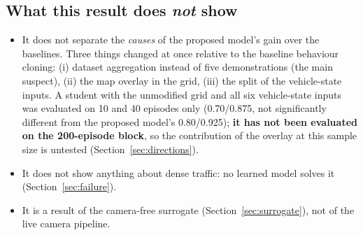 



\subsection{What this result does \emph{not} show}
\begin{itemize}
\item It does not separate the \emph{causes} of the proposed model's gain over the baselines. Three things changed at once relative to the baseline behaviour cloning: (i) dataset aggregation instead of five demonstrations (the main suspect), (ii) the map overlay in the grid, (iii) the split of the vehicle-state inputs. A student with the unmodified grid and all six vehicle-state inputs was evaluated on 10 and 40 episodes only (0.70/0.875, not significantly different from the proposed model's 0.80/0.925);
  \textbf{it has not been evaluated on the 200-episode block}, so the contribution of the overlay at this sample size is untested (Section~\ref{sec:directions}).
\item It does not show anything about dense traffic: no learned model solves it (Section~\ref{sec:failure}).
\item It is a result of the camera-free surrogate (Section~\ref{sec:surrogate}), not of the live camera pipeline.
\end{itemize}
